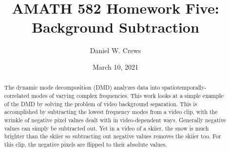 \documentclass{article}
\title{AMATH 582 Homework Five: Background Subtraction}
\author{Daniel W. Crews}
\date{March 10, 2021}
\begin{document}
\maketitle

\begin{abstract}
  The dynamic mode decomposition (DMD) analyzes data into spatiotemporally-correlated modes of varying complex frequencies. This work looks at a simple example of the DMD by solving the problem of video background separation. This is accomplished by subtracting the lowest frequency modes from a video clip, with the wrinkle of negative pixel values dealt with in video-dependent ways. Generally negative values can simply be subtracted out. Yet in a video of a skiier, the snow is much brighter than the skiier so subtracting out negative values removes the skiier too. For this clip, the negative pixels are flipped to their absolute values. %
\end{abstract}
\end{document}

